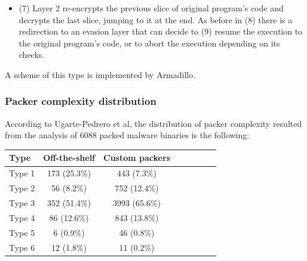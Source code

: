 \begin{itemize}
\item (7) Layer 2 re-encrypts the previous slice of original program's code and decrypts the last slice, jumping to it at the end. As before in (8) there is a redirection to an evasion layer that can decide to (9) resume the execution to the original program's code, or to abort the execution depending on its checks.
\end{itemize}

A scheme of this type is implemented by Armadillo.

\subsubsection{Packer complexity distribution}

According to Ugarte-Pedrero et al\cite{sokpacker}, the distribution of packer complexity resulted from the analysis of 6088 packed malware binaries is the following:

\begin{table}[H]
\begin{center}
\begin{tabular}{l*{6}{c}r}
Type      & Off-the-shelf & Custom packers \\
\hline
Type 1 &       173 (25.3\%) & 443 (7.3\%) \\
Type 2 &       56 (8.2\%) & 752 (12.4\%) \\
Type 3 &       352 (51.4\%)  & 3993 (65.6\%) \\
Type 4 &       86 (12.6\%) & 843 (13.8\%) \\
Type 5 &       6 (0.9\%)  & 46 (0.8\%) \\
Type 6 &       12 (1.8\%) & 11 (0.2\%) \\
\end{tabular}
\end{center}
\end{table}

